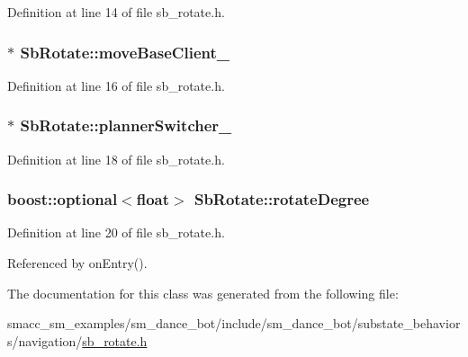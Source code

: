Definition at line 14 of file sb\+\_\+rotate.\+h.

\subsubsection[{\texorpdfstring{move\+Base\+Client\+\_\+}{moveBaseClient_}}]{$\ast$ Sb\+Rotate\+::move\+Base\+Client\+\_\+}\hypertarget{classSbRotate_ab6cc0ea1c2e05c0e1ebd57ed6c7d6725}{}\label{classSbRotate_ab6cc0ea1c2e05c0e1ebd57ed6c7d6725}


Definition at line 16 of file sb\+\_\+rotate.\+h.

\subsubsection[{\texorpdfstring{planner\+Switcher\+\_\+}{plannerSwitcher_}}]{$\ast$ Sb\+Rotate\+::planner\+Switcher\+\_\+}\hypertarget{classSbRotate_a21a2ad273b990ffcd617b730310f9e98}{}\label{classSbRotate_a21a2ad273b990ffcd617b730310f9e98}


Definition at line 18 of file sb\+\_\+rotate.\+h.

\subsubsection[{\texorpdfstring{rotate\+Degree}{rotateDegree}}]{\setlength{\rightskip}{0pt plus 5cm}boost\+::optional$<$float$>$ Sb\+Rotate\+::rotate\+Degree}\hypertarget{classSbRotate_aeaec32fdba434d9482548bda764b0fe0}{}\label{classSbRotate_aeaec32fdba434d9482548bda764b0fe0}


Definition at line 20 of file sb\+\_\+rotate.\+h.



Referenced by on\+Entry().



The documentation for this class was generated from the following file\+:\begin{DoxyCompactItemize}
\item 
smacc\+\_\+sm\+\_\+examples/sm\+\_\+dance\+\_\+bot/include/sm\+\_\+dance\+\_\+bot/substate\+\_\+behaviors/navigation/\hyperlink{sb__rotate_8h}{sb\+\_\+rotate.\+h}\end{DoxyCompactItemize}
